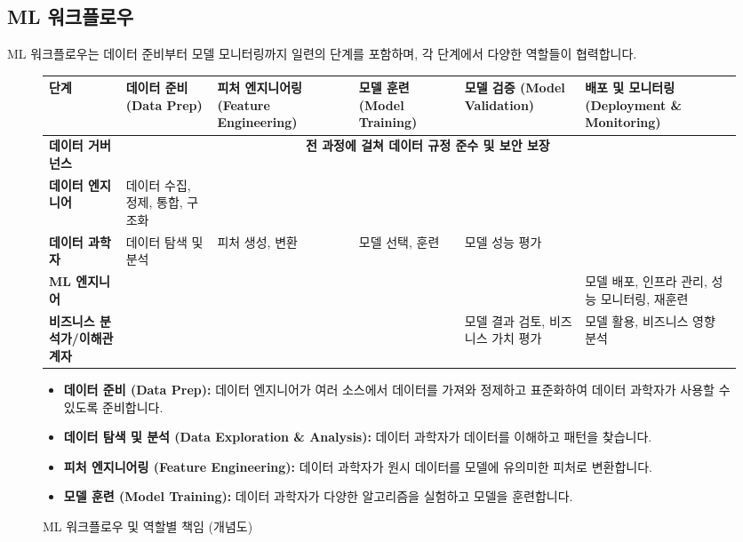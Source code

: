 \documentclass[11pt,a4paper]{article}
\begin{document}
\subsection{ML 워크플로우}

ML 워크플로우는 데이터 준비부터 모델 모니터링까지 일련의 단계를 포함하며, 각 단계에서 다양한 역할들이 협력합니다.

\begin{figure}[h!]
    \centering
    \caption{ML 워크플로우 및 역할별 책임 (개념도)}
    \label{fig:ml_workflow_roles}
    \begin{adjustbox}{width=\textwidth}
    \begin{tabular}{p{} | p{} | p{} | p{} | p{} | p{}}
    \toprule
    \textbf{단계} & \textbf{데이터 준비 (Data Prep)} & \textbf{피처 엔지니어링 (Feature Engineering)} & \textbf{모델 훈련 (Model Training)} & \textbf{모델 검증 (Model Validation)} & \textbf{배포 및 모니터링 (Deployment \& Monitoring)} \\
    \midrule
    \textbf{데이터 거버넌스} & \multicolumn{5}{c}{\textbf{전 과정에 걸쳐 데이터 규정 준수 및 보안 보장}} \\
    \textbf{데이터 엔지니어} & 데이터 수집, 정제, 통합, 구조화 & & & & \\
    \textbf{데이터 과학자} & 데이터 탐색 및 분석 & 피처 생성, 변환 & 모델 선택, 훈련 & 모델 성능 평가 & \\
    \textbf{ML 엔지니어} & & & & & 모델 배포, 인프라 관리, 성능 모니터링, 재훈련 \\
    \textbf{비즈니스 분석가/이해관계자} & & & & 모델 결과 검토, 비즈니스 가치 평가 & 모델 활용, 비즈니스 영향 분석 \\
    \bottomrule
    \end{tabular}
    \end{adjustbox}
    \vspace{1em}
    \begin{itemize}
        \item \textbf{데이터 준비 (Data Prep):} 데이터 엔지니어가 여러 소스에서 데이터를 가져와 정제하고 표준화하여 데이터 과학자가 사용할 수 있도록 준비합니다.
        \item \textbf{데이터 탐색 및 분석 (Data Exploration \& Analysis):} 데이터 과학자가 데이터를 이해하고 패턴을 찾습니다.
        \item \textbf{피처 엔지니어링 (Feature Engineering):} 데이터 과학자가 원시 데이터를 모델에 유의미한 피처로 변환합니다.
        \item \textbf{모델 훈련 (Model Training):} 데이터 과학자가 다양한 알고리즘을 실험하고 모델을 훈련합니다.

\end{itemize}
\end{figure}
\end{document}
